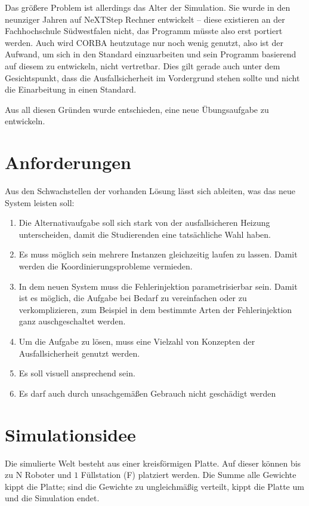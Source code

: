 Das gr{\"{o}}{\ss}ere Problem ist allerdings das Alter der Simulation. Sie wurde in den neunziger Jahren auf 
NeXTStep Rechner entwickelt -- diese existieren an der Fachhochschule S{\"{u}}dwestfalen nicht, das Programm 
m{\"{u}}sste also erst portiert werden. Auch wird CORBA heutzutage nur noch wenig genutzt, also ist der Aufwand,
um sich in den Standard einzuarbeiten und sein Programm basierend auf diesem zu entwickeln, nicht vertretbar. 
Dies gilt gerade auch unter dem Gesichtspunkt, dass die Ausfallsicherheit im Vordergrund stehen sollte und
nicht die Einarbeitung in einen Standard.

Aus all diesen Gr{\"{u}}nden wurde entschieden, eine neue {\"{U}}bungsaufgabe zu entwickeln.

\clearpage
\section{Anforderungen}\label{anforderung}
Aus den Schwachstellen der vorhanden L{\"{o}}sung l{\"{a}}sst sich ableiten, was das neue System leisten soll:
\begin{enumerate}
	\item Die Alternativaufgabe soll sich stark von der ausfallsicheren Heizung unterscheiden, damit die Studierenden eine tats{\"{a}}chliche Wahl haben.
	\item Es muss m{\"{o}}glich sein mehrere Instanzen gleichzeitig laufen zu lassen. Damit werden die Koordinierungsprobleme vermieden.
	\item In dem neuen System muss die Fehlerinjektion parametrisierbar sein. Damit ist es m{\"{o}}glich,
		die Aufgabe bei Bedarf zu vereinfachen oder zu verkomplizieren, zum Beispiel in dem bestimmte
		Arten der Fehlerinjektion ganz auschgeschaltet werden.
	\item Um die Aufgabe zu l{\"{o}}sen, muss eine Vielzahl von Konzepten der Ausfallsicherheit genutzt werden.
	\item Es soll visuell ansprechend sein.
	\item Es darf auch durch unsachgem{\"{a}}{\ss}en Gebrauch nicht gesch{\"{a}}digt werden
\end{enumerate}

\clearpage
\section{Simulationsidee}
Die simulierte Welt besteht aus einer kreisf{\"{o}}rmigen Platte. Auf dieser k{\"{o}}nnen bis zu \gls{N}
Roboter und $1$ F{\"{u}}llstation (\gls{F}) platziert werden. Die Summe alle Gewichte kippt die Platte;
sind die Gewichte zu ungleichm{\"{a}}{\ss}ig verteilt, kippt die Platte um und die Simulation endet.

